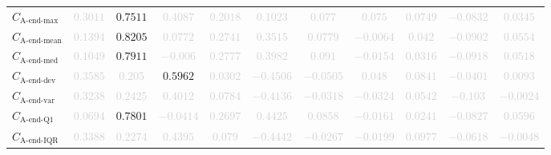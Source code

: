 \documentclass{standalone}
\newcommand{\lastmaxname}{\text{A-end-max}}
\newcommand{\lastmax}{C_{\lastmaxname}}
\newcommand{\lastmeanname}{\text{A-end-mean}}
\newcommand{\lastmean}{C_{\lastmeanname}}
\newcommand{\lastmedianname}{\text{A-end-med}}
\newcommand{\lastmedian}{C_{\lastmedianname}}
\newcommand{\lastdevname}{\text{A-end-dev}}
\newcommand{\lastdev}{C_{\lastdevname}}
\newcommand{\lastvarname}{\text{A-end-var}}
\newcommand{\lastvar}{C_{\lastvarname}}
\newcommand{\lastqonename}{\text{A-end-Q1}}
\newcommand{\lastqone}{C_{\lastqonename}}
\newcommand{\lastiqrname}{\text{A-end-IQR}}
\newcommand{\lastiqr}{C_{\lastiqrname}}
\begin{document}
\begin{tabular}{lcccccccccc}
$\lastmax$ & \textcolor{lightgray}{$0.3011$} & $0.7511$ & \textcolor{lightgray}{$0.4087$} & \textcolor{lightgray}{$0.2018$} & \textcolor{lightgray}{$0.1023$} & \textcolor{lightgray}{$0.077$} & \textcolor{lightgray}{$0.075$} & \textcolor{lightgray}{$0.0749$} & \textcolor{lightgray}{$-0.0832$} & \textcolor{lightgray}{$0.0345$} \\ 
$\lastmean$ & \textcolor{lightgray}{$0.1394$} & $0.8205$ & \textcolor{lightgray}{$0.0772$} & \textcolor{lightgray}{$0.2741$} & \textcolor{lightgray}{$0.3515$} & \textcolor{lightgray}{$0.0779$} & \textcolor{lightgray}{$-0.0064$} & \textcolor{lightgray}{$0.042$} & \textcolor{lightgray}{$-0.0902$} & \textcolor{lightgray}{$0.0554$} \\ 
$\lastmedian$ & \textcolor{lightgray}{$0.1049$} & $0.7911$ & \textcolor{lightgray}{$-0.006$} & \textcolor{lightgray}{$0.2777$} & \textcolor{lightgray}{$0.3982$} & \textcolor{lightgray}{$0.091$} & \textcolor{lightgray}{$-0.0154$} & \textcolor{lightgray}{$0.0316$} & \textcolor{lightgray}{$-0.0918$} & \textcolor{lightgray}{$0.0518$} \\ 
$\lastdev$ & \textcolor{lightgray}{$0.3585$} & \textcolor{lightgray}{$0.205$} & $0.5962$ & \textcolor{lightgray}{$0.0302$} & \textcolor{lightgray}{$-0.4506$} & \textcolor{lightgray}{$-0.0505$} & \textcolor{lightgray}{$0.048$} & \textcolor{lightgray}{$0.0841$} & \textcolor{lightgray}{$-0.0401$} & \textcolor{lightgray}{$0.0093$} \\ 
$\lastvar$ & \textcolor{lightgray}{$0.3238$} & \textcolor{lightgray}{$0.2425$} & \textcolor{lightgray}{$0.4012$} & \textcolor{lightgray}{$0.0784$} & \textcolor{lightgray}{$-0.4136$} & \textcolor{lightgray}{$-0.0318$} & \textcolor{lightgray}{$-0.0324$} & \textcolor{lightgray}{$0.0542$} & \textcolor{lightgray}{$-0.103$} & \textcolor{lightgray}{$-0.0024$} \\ 
$\lastqone$ & \textcolor{lightgray}{$0.0694$} & $0.7801$ & \textcolor{lightgray}{$-0.0414$} & \textcolor{lightgray}{$0.2697$} & \textcolor{lightgray}{$0.4425$} & \textcolor{lightgray}{$0.0858$} & \textcolor{lightgray}{$-0.0161$} & \textcolor{lightgray}{$0.0241$} & \textcolor{lightgray}{$-0.0827$} & \textcolor{lightgray}{$0.0596$} \\ 
$\lastiqr$ & \textcolor{lightgray}{$0.3388$} & \textcolor{lightgray}{$0.2274$} & \textcolor{lightgray}{$0.4395$} & \textcolor{lightgray}{$0.079$} & \textcolor{lightgray}{$-0.4442$} & \textcolor{lightgray}{$-0.0267$} & \textcolor{lightgray}{$-0.0199$} & \textcolor{lightgray}{$0.0977$} & \textcolor{lightgray}{$-0.0618$} & \textcolor{lightgray}{$-0.0048$} \\ 

\end{tabular}
\end{document}
